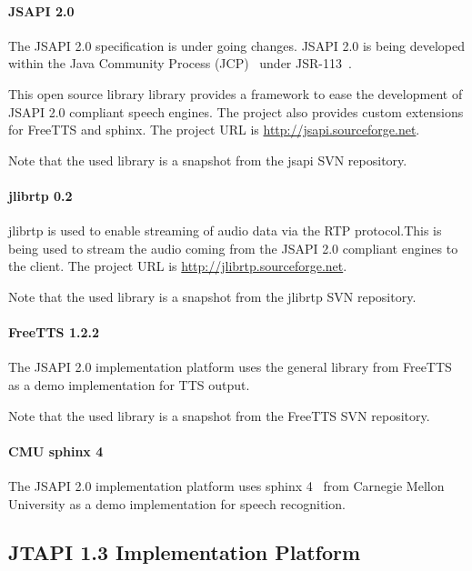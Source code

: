 \documentclass[11pt,a4paper]{article}
\begin{document}
\paragraph{JSAPI 2.0}
\label{sec:jsapi20}

The JSAPI 2.0 specification is under going changes.
JSAPI 2.0 is being developed within
the Java Community Process (JCP)~\cite{jcp} under 
JSR-113~\cite{jcp:jsr113}.

This open source library library provides a framework to ease the development of
JSAPI 2.0 compliant speech engines. The project also provides custom extensions for
FreeTTS and sphinx. The project URL is \url{http://jsapi.sourceforge.net}.

Note that the used library is a snapshot from the jsapi SVN repository.

\paragraph{jlibrtp 0.2}

jlibrtp is used to enable streaming of audio data via the RTP protocol.This
is being used to stream the audio coming from the JSAPI 2.0 compliant
engines to the client. The project URL is \url{http://jlibrtp.sourceforge.net}.

Note that the used library is a snapshot from the jlibrtp SVN repository.

\paragraph{FreeTTS 1.2.2}

The JSAPI 2.0 implementation platform uses the general library from
FreeTTS~\cite{freetts} as a demo implementation for TTS output.

Note that the used library is a snapshot from the FreeTTS SVN repository.

\paragraph{CMU sphinx 4}
\label{sec:sphinx}

The JSAPI 2.0 implementation platform uses sphinx 4~\cite{sphinx} from
Carnegie Mellon University as a demo implementation for speech recognition.

\subsection{JTAPI 1.3 Implementation Platform}
\end{document}
